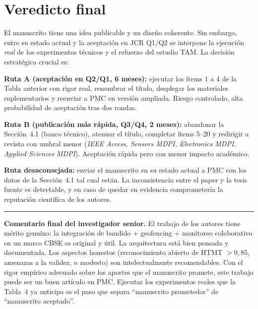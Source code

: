 \documentclass[11pt,a4paper]{article}
\begin{document}
\section{Veredicto final}

\begin{verdicto}
El manuscrito tiene una idea publicable y un dise\~no coherente. Sin embargo, entre su estado actual y la aceptaci\'on en JCR Q1/Q2 se interpone la ejecuci\'on \emph{real} de los experimentos t\'ecnicos y el refuerzo del estudio TAM. La decisi\'on estrat\'egica crucial es:
\end{verdicto}

\textbf{Ruta A (aceptaci\'on en Q2/Q1, 6 meses):} ejecutar los \'items 1 a 4 de la Tabla anterior con rigor real, renombrar el t\'itulo, desplegar los materiales suplementarios y reenviar a PMC en versi\'on ampliada. Riesgo controlado, alta probabilidad de aceptaci\'on tras dos rondas.

\textbf{Ruta B (publicaci\'on m\'as r\'apida, Q3/Q4, 2 meses):} abandonar la Secci\'on~4.1 (banco t\'ecnico), atenuar el t\'itulo, completar \'items 5--20 y redirigir a revista con umbral menor (\emph{IEEE Access, Sensors MDPI, Electronics MDPI, Applied Sciences MDPI}). Aceptaci\'on r\'apida pero con menor impacto acad\'emico.

\textbf{Ruta desaconsejada:} enviar el manuscrito en su estado actual a PMC con los datos de la Secci\'on~4.1 tal cual est\'an. La inconsistencia entre el paper y la tesis fuente es detectable, y en caso de quedar en evidencia comprometer\'ia la reputaci\'on cient\'ifica de los autores.

\begin{center}
\rule{0.4\linewidth}{0.4pt}
\end{center}

\textbf{Comentario final del investigador senior.} El trabajo de los autores tiene m\'erito genuino: la integraci\'on de bandido + geofencing + monitoreo colaborativo en un marco CBSE es original y \'util. La arquitectura est\'a bien pensada y documentada. Los aspectos honestos (reconocimiento abierto de HTMT $>0{,}85$, amenazas a la validez, $n$ modesto) son intelectualmente recomendables. Con el rigor emp\'irico adecuado sobre los aportes que el manuscrito promete, este trabajo puede ser un buen art\'iculo en PMC. Ejecutar los experimentos reales que la Tabla~4 ya anticipa es el paso que separa ``manuscrito prometedor'' de ``manuscrito aceptado''.
\end{document}

